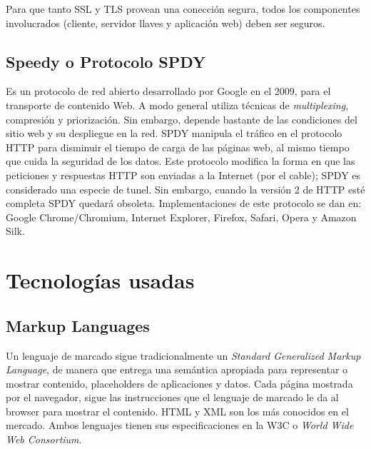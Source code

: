     Para que tanto SSL y TLS provean una conección segura, todos los componentes involucrados (cliente, servidor llaves y aplicación web) deben ser seguros.

    \subsection{Speedy o Protocolo SPDY}
    \label{chap2:spdy}
    Es un protocolo de red abierto desarrollado por Google en el 2009, para el transporte de contenido Web. A modo general utiliza técnicas de \textit{multiplexing}, compresión y priorización. Sin embargo, depende bastante de las condiciones del sitio web y su despliegue en la red. SPDY manipula el tráfico en el protocolo HTTP para disminuir el tiempo de carga de las páginas web, al mismo tiempo que cuida la seguridad de los datos. Este protocolo modifica la forma en que las peticiones y respuestas HTTP son enviadas a la Internet (por el cable); SPDY es considerado una especie de tunel. Sin embargo, cuando la versión 2 de HTTP esté completa SPDY quedará obsoleta. Implementaciones de este protocolo se dan en: Google Chrome/Chromium, Internet Explorer, Firefox, Safari, Opera y Amazon Silk.
    

\section{Tecnologías usadas}

    \subsection{Markup Languages}
    \label{chap2:markup}
        Un lenguaje de marcado sigue tradicionalmente un \textit{Standard Generalized Markup Language}, de manera que entrega una semántica apropiada para representar o mostrar contenido, placeholders de aplicaciones y datos. Cada página mostrada por el navegador, sigue las instrucciones que el lenguaje de marcado le da al browser para mostrar el contenido. HTML y XML son los más conocidos en el mercado. Ambos lenguajes tienen sus especificaciones en la W3C o \textit{World Wide Web Consortium}.

